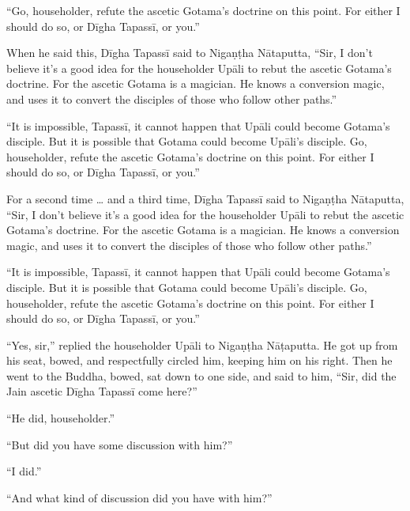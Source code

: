 \documentclass[12pt,openany]{book}%
\begin{document}
“Go, householder, refute the ascetic Gotama’s doctrine on this point. For either I should do so, or \textsanskrit{Dīgha} \textsanskrit{Tapassī}, or you.” 

When he said this, \textsanskrit{Dīgha} \textsanskrit{Tapassī} said to \textsanskrit{Nigaṇṭha} \textsanskrit{Nātaputta}, “Sir, I don’t believe it’s a good idea for the householder \textsanskrit{Upāli} to rebut the ascetic Gotama’s doctrine. For the ascetic Gotama is a magician. He knows a conversion magic, and uses it to convert the disciples of those who follow other paths.” 

“It is impossible, \textsanskrit{Tapassī}, it cannot happen that \textsanskrit{Upāli} could become Gotama’s disciple. But it is possible that Gotama could become \textsanskrit{Upāli}’s disciple. Go, householder, refute the ascetic Gotama’s doctrine on this point. For either I should do so, or \textsanskrit{Dīgha} \textsanskrit{Tapassī}, or you.” 

For a second time … and a third time, \textsanskrit{Dīgha} \textsanskrit{Tapassī} said to \textsanskrit{Nigaṇṭha} \textsanskrit{Nātaputta}, “Sir, I don’t believe it’s a good idea for the householder \textsanskrit{Upāli} to rebut the ascetic Gotama’s doctrine. For the ascetic Gotama is a magician. He knows a conversion magic, and uses it to convert the disciples of those who follow other paths.” 

“It is impossible, \textsanskrit{Tapassī}, it cannot happen that \textsanskrit{Upāli} could become Gotama’s disciple. But it is possible that Gotama could become \textsanskrit{Upāli}’s disciple. Go, householder, refute the ascetic Gotama’s doctrine on this point. For either I should do so, or \textsanskrit{Dīgha} \textsanskrit{Tapassī}, or you.” 

“Yes, sir,” replied the householder \textsanskrit{Upāli} to \textsanskrit{Nigaṇṭha} \textsanskrit{Nāṭaputta}. He got up from his seat, bowed, and respectfully circled him, keeping him on his right. Then he went to the Buddha, bowed, sat down to one side, and said to him, “Sir, did the Jain ascetic \textsanskrit{Dīgha} \textsanskrit{Tapassī} come here?” 

“He did, householder.” 

“But did you have some discussion with him?” 

“I did.” 

“And what kind of discussion did you have with him?” 
\end{document}
